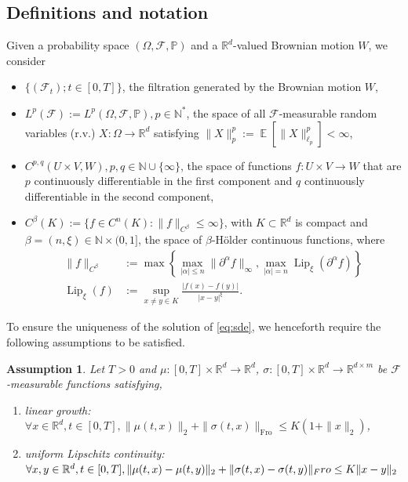 \documentclass[12pt]{article}
\theoremstyle{remark}
\theoremstyle{plain}
\newtheorem{assumption}[theorem]{Assumption}
\numberwithin{equation}{section}
\DeclareMathOperator{\E}{\mathbb E}
\DeclareMathOperator{\Lip}{Lip}
\newcommand{\N}{\mathbb{N}}
\newcommand{\R}{\mathbb{R}}
\begin{document}
\subsection{Definitions and notation}
Given a probability space $(\Omega, \mathcal F, \mathbb P)$ and a $\R^d$-valued Brownian motion $W$, we consider
\begin{itemize}
    \item $\{(\mathcal F_t); t \in [0,T]\}$, the filtration generated by the Brownian motion $W$,
    \item $L^p(\mathcal F) := L^p(\Omega, \mathcal F, \mathbb P), p \in \N^*$, the space of all $\mathcal F$-measurable random variables (r.v.) $X : \Omega \to \R^d$ satisfying $\|X\|_p^p := \E[\|X\|_{\ell_p}^p] < \infty$,
    \item $C^{p,q}(U \times V, W), p,q \in \N \cup \{\infty\}$, the space of functions $f : U \times V \to W$ that are $p$ continuously differentiable in the first component and $q$ continuously differentiable in the second component,
    \item $C^\beta(K) := \{f \in C^n(K) : \|f\|_{C^\beta} \leq \infty\}$, with $K \subset \R^d$ is compact and $\beta = (n,\xi) \in \N \times (0,1]$, the space of $\beta$-H\"older continuous functions, where
    \begin{align*}
        \|f\|_{C^\beta} &:= \max\left\{\max_{|\alpha| \leq n}\|\partial^\alpha f\|_\infty, \max_{|\alpha| = n}\Lip_\xi(\partial^\alpha f) \right\}\\
        \Lip_\xi(f) &:= \sup_{x \neq y \in K}\frac{|f(x)-f(y)|}{|x-y|^\xi}.
    \end{align*}
\end{itemize}

To ensure the uniqueness of the solution of \cref{eq:sde}, we henceforth require the following assumptions to be satisfied.
\begin{assumption}\label{assump:uniqueness_sde}
    Let $T>0$ and $\mu:[0,T]\times \R^d \to \R^d$, $\sigma : [0,T] \times \R^d \to \R^{d\times m}$ be $\mathcal F$-measurable functions satisfying,
    \begin{enumerate}
        \item linear growth: $\forall x \in \R^d, t \in [0,T], \|\mu(t,x)\|_2 + \|\sigma(t,x)\|_{\text{Fro}} \leq K(1+\|x\|_2)$,
        \item uniform Lipschitz continuity: $\forall x,y \in \R^d, t \in [0,T], \|\mu(t,x)-\mu(t,y)\|_2 + \|\sigma(t,x)-\sigma(t,y)\|_\emph{Fro} \leq K\|x-y\|_2$
    \end{enumerate}
\end{assumption}
\end{document}
